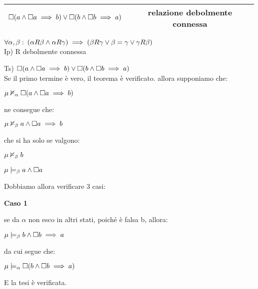\begin{tabular}{|c|c|}
\hline 
$\square(a\wedge\square a\implies b)\vee\square(b\wedge\square b\implies a)$  & relazione debolmente connessa \tabularnewline
\hline 
\end{tabular}

$\forall\alpha,\beta:\:(\alpha R\beta\wedge\alpha R\gamma)\implies(\beta R\gamma\vee\beta=\gamma\vee\gamma R\beta)$\\


Ip) R debolmente connessa

Ts) $\square(a\wedge\square a\implies b)\vee\square(b\wedge\square b\implies a)$\\


Se il primo termine è vero, il teorema è verificato. allora supponiamo
che:

$\mu\nvDash_{\alpha}\square(a\wedge\square a\implies b)$

ne consegue che:

$\mu\nvDash_{\beta}a\wedge\square a\implies b$

che si ha solo se valgono:

$\mu\nvDash_{\beta}b$

$\mu\models_{\beta}a\wedge\square a$

Dobbiamo allora verificare 3 casi:

\textbf{Caso 1 }

se da $\alpha$ non esco in altri stati, poiché è falsa b, allora:

$\mu\models_{\beta}b\wedge\square b\implies a$

da cui segue che:

$\mu\models_{\alpha}\square(b\wedge\square b\implies a)$

E la tesi è verificata.

\begin{center} 
\end{center}

